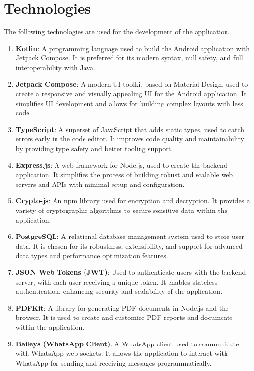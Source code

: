 \section{Technologies}\label{sec:technologies}
\justify

The following technologies are used for the development of the application.

\begin{enumerate}[label=\roman*.]
  \item \textbf{Kotlin}: A programming language used to build the Android application with Jetpack Compose.
  It is preferred for its modern syntax, null safety, and full interoperability with Java.\cite{kt}
  \item \textbf{Jetpack Compose}: A modern UI toolkit based on Material Design, used to create a responsive and visually appealing UI for the Android application.
  It simplifies UI development and allows for building complex layouts with less code.\cite{kt}
  \item \textbf{TypeScript}: A superset of JavaScript that adds static types, used to catch errors early in the code editor.
  It improves code quality and maintainability by providing type safety and better tooling support.\cite{TypeScript}
  \item \textbf{Express.js}: A web framework for Node.js, used to create the backend application.
  It simplifies the process of building robust and scalable web servers and APIs with minimal setup and configuration.\cite{Express}
  \item \textbf{Crypto-js}: An npm library used for encryption and decryption.
  It provides a variety of cryptographic algorithms to secure sensitive data within the application.\cite{Crypto-js}
  \item \textbf{PostgreSQL}: A relational database management system used to store user data.
  It is chosen for its robustness, extensibility, and support for advanced data types and performance optimization features.\cite{psql}
  \item \textbf{JSON Web Tokens (JWT)}: Used to authenticate users with the backend server, with each user receiving a unique token.
  It enables stateless authentication, enhancing security and scalability of the application.\cite{JWT}
  \item \textbf{PDFKit}: A library for generating PDF documents in Node.js and the browser.
  It is used to create and customize PDF reports and documents within the application.\cite{PDFKit}
  \item \textbf{Baileys (WhatsApp Client)}: A WhatsApp client used to communicate with WhatsApp web sockets.
  It allows the application to interact with WhatsApp for sending and receiving messages programmatically.\cite{Baileys}
\end{enumerate}
